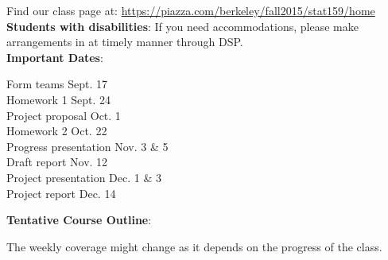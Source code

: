\documentclass[11pt]{article}
\begin{document}
Find our class page at: \url{https://piazza.com/berkeley/fall2015/stat159/home}\\

\textbf{Students with disabilities}: If you need accommodations, please make
arrangements in at timely manner through DSP.\\

\noindent\textbf{Important Dates}:
\begin{center} \begin{minipage}{5in}
\begin{flushleft}
Form teams \dotfill Sept. 17\\
Homework 1 \dotfill Sept. 24\\
Project proposal \dotfill Oct. 1\\
Homework 2 \dotfill Oct. 22\\
Progress presentation \dotfill Nov. 3 \& 5\\
Draft report \dotfill Nov. 12\\
Project presentation \dotfill Dec. 1 \& 3\\
Project report \dotfill Dec. 14\\
\end{flushleft}
\end{minipage}
\end{center}

\newpage

\textbf {\large Tentative Course Outline}:

The weekly coverage might change as it depends on the progress of the class.
\end{document}
